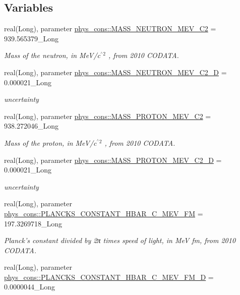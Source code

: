 \subsection*{Variables}
\begin{DoxyCompactItemize}
\item 
real(Long), parameter \hyperlink{namespacephys__cons_a9e80f5448f5f42cf9983890809e55d88}{phys\_\-cons::MASS\_\-NEUTRON\_\-MEV\_\-C2} = 939.565379\_\-Long
\begin{DoxyCompactList}\small\item\em Mass of the neutron, in MeV/c$^{\mbox{$^\wedge$2}}$ , from 2010 CODATA. \item\end{DoxyCompactList}\item 
real(Long), parameter \hyperlink{namespacephys__cons_ab5fb46dc243eb307a344a134a593edd0}{phys\_\-cons::MASS\_\-NEUTRON\_\-MEV\_\-C2\_\-D} = 0.000021\_\-Long
\begin{DoxyCompactList}\small\item\em uncertainty \item\end{DoxyCompactList}\item 
real(Long), parameter \hyperlink{namespacephys__cons_a3460d18828c87b266ab35b1cdeb4a0a5}{phys\_\-cons::MASS\_\-PROTON\_\-MEV\_\-C2} = 938.272046\_\-Long
\begin{DoxyCompactList}\small\item\em Mass of the proton, in MeV/c$^{\mbox{$^\wedge$2}}$ , from 2010 CODATA. \item\end{DoxyCompactList}\item 
real(Long), parameter \hyperlink{namespacephys__cons_a3299e2ce8c6c720ed740eff7968b27a8}{phys\_\-cons::MASS\_\-PROTON\_\-MEV\_\-C2\_\-D} = 0.000021\_\-Long
\begin{DoxyCompactList}\small\item\em uncertainty \item\end{DoxyCompactList}\item 
real(Long), parameter \hyperlink{namespacephys__cons_a7efa4134b36e258435906be7fd9ca165}{phys\_\-cons::PLANCKS\_\-CONSTANT\_\-HBAR\_\-C\_\-MEV\_\-FM} = 197.3269718\_\-Long
\begin{DoxyCompactList}\small\item\em Planck's constant divided by 2π times speed of light, in MeV fm, from 2010 CODATA. \item\end{DoxyCompactList}\item 
real(Long), parameter \hyperlink{namespacephys__cons_a86cb86e86548ce7318d0143b2f4b2f88}{phys\_\-cons::PLANCKS\_\-CONSTANT\_\-HBAR\_\-C\_\-MEV\_\-FM\_\-D} = 0.0000044\_\-Long
\end{DoxyCompactItemize}
